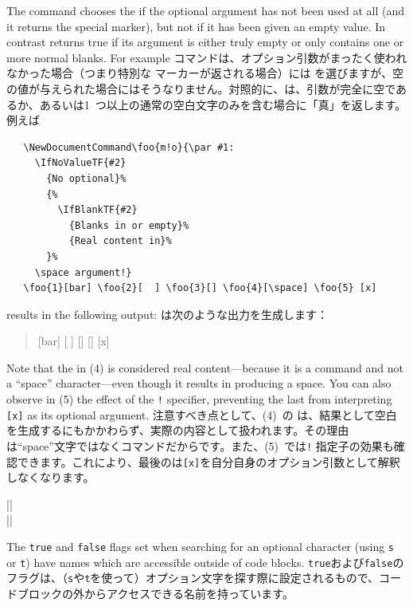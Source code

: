 \documentclass{ltxguide}
\newcommand\jpnewline{\vspace{3pt}\newline}
\begin{document}
The  command chooses the  if the optional argument has not
been used at all (and it returns the special 
marker), but not if it has been given an empty value. In contrast
 returns true if its argument is either truly empty or
only contains one or more normal blanks.
For example
\jpnewline
コマンドは、オプション引数がまったく使われなかった場合（つまり特別な マーカーが返される場合）には を選びますが、空の値が与えられた場合にはそうなりません。対照的に、は、引数が完全に空であるか、あるいは1~つ以上の通常の空白文字のみを含む場合に「真」を返します。
例えば
\begin{verbatim}
   \NewDocumentCommand\foo{m!o}{\par #1:
     \IfNoValueTF{#2}
       {No optional}%
       {%
         \IfBlankTF{#2}
           {Blanks in or empty}%
           {Real content in}%
       }%
     \space argument!}
   \foo{1}[bar] \foo{2}[  ] \foo{3}[] \foo{4}[\space] \foo{5} [x]
\end{verbatim}
results
in the following output:
\jpnewline
は次のような出力を生成します：
\begin{quote}
  \NewDocumentCommand{}
  [bar] [  ] [] [\space]  [x]
\end{quote}

Note that the  in (4) is considered real content---because it is
a command and not a \enquote{space} character---even though it results
in producing a space. You can also observe in (5) the effect of the
\texttt{!} specifier, preventing the last 
from interpreting \texttt{[x]} as its optional argument.
\jpnewline
注意すべき点として、(4)~の は、結果として空白を生成するにもかかわらず、実際の内容として扱われます。その理由は\enquote{space}文字ではなくコマンドだからです。また、(5)~では\texttt{!} 指定子の効果も確認できます。これにより、最後のは\texttt{[x]}を自分自身のオプション引数として解釈しなくなります。


\begin{decl}
  |\BooleanFalse|  \\
  |\BooleanTrue|
\end{decl}
The \texttt{true} and \texttt{false} flags set when searching for
an optional character (using \texttt{s} or \texttt{t}) have
names which are accessible outside of code blocks.
\jpnewline
\texttt{true}および\texttt{false}のフラグは、（\texttt{s}や\texttt{t}を使って）オプション文字を探す際に設定されるもので、コードブロックの外からアクセスできる名前を持っています。
\end{document}
